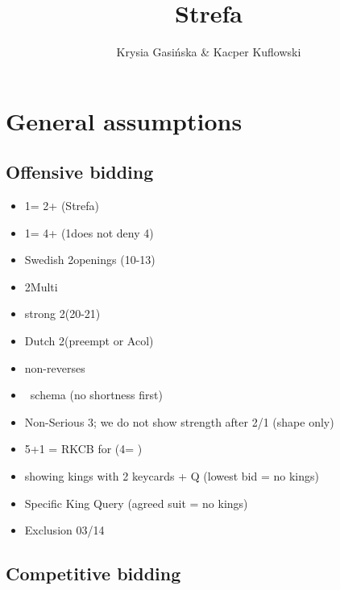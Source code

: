 \documentclass[12pt, a4paper]{report}
\title{\spades\clubs Strefa \xdiams\xhearts}
\author{Krysia Gasińska \& Kacper Kuflowski}
\begin{document}
\maketitle

\tableofcontents

\chapter*{\colorbox{Plum!30}{General assumptions}}
 {

    \section*{\colorbox{blue!30}{Offensive bidding}}
        \begin{itemize}
            \item 1\clubs = 2+ (Strefa)
            \item 1\diams = 4+ (1\clubs does not deny 4\diams)
            \item Swedish 2\major openings (10-13)
            \item 2\diams Multi
            \item strong 2\nt (20-21)
            \item Dutch 2\clubs (\diams preempt or Acol)
            \item non-\gf reverses
            \item \hsf\ schema (no shortness first)
            \item Non-Serious 3\nt; we do not show strength after 2/1 (shape only)
            \item 5\minor+1 = RKCB for \minor (4\nt = \nat)
            \item showing kings with 2 keycards + Q (lowest bid = no kings)
            \item Specific King Query (agreed suit = no kings)
            \item Exclusion 03/14
        \end{itemize}
    
    \section*{\colorbox{blue!30}{Competitive bidding}}

}
\end{document}
